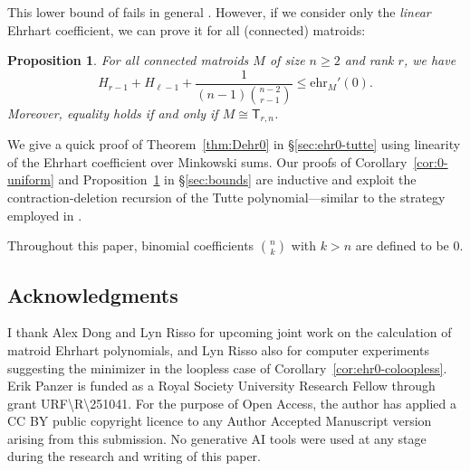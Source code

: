 \documentclass[pagesize,paper=A4,11pt,bibliography=totoc,oneside]{scrartcl}
\newtheorem{proposition}[thm]{Proposition}
\newcommand{\MM}[2]{\mathsf{T}_{#2,#1}} %
\newcommand{\ehr}{\mathrm{ehr}}
\newcommand{\HN}{H} %
\begin{document}
 This lower bound of \cite[Conjecture~1.5]{Ferroni:EhrhartMinimal} fails in general \cite{Ferroni:MatNotEhr}. However, if we consider only the \emph{linear} Ehrhart coefficient, we can prove it for all (connected) matroids:
\begin{proposition}\label{prop:MM}
    For all connected matroids $M$ of size $n\geq 2$ and rank $r$, we have
    \begin{equation*}
        \HN_{r-1} + \HN_{\ell-1} + \frac{1}{(n-1)\binom{n-2}{r-1}} \leq \ehr_M'(0).
    \end{equation*}
    Moreover, equality holds if and only if $M\cong \MM{n}{r}$.
\end{proposition}

We give a quick proof of Theorem~\ref{thm:Dehr0} in \S\ref{sec:ehr0-tutte} using linearity of the Ehrhart coefficient over Minkowski sums. Our proofs of Corollary~\ref{cor:0-uniform} and Proposition~\ref{prop:MM} in \S\ref{sec:bounds} are inductive and exploit the contraction-deletion recursion of the Tutte polynomial---similar to the strategy employed in \cite{Murty:NumberBases}.

Throughout this paper, binomial coefficients $\binom{n}{k}$ with $k>n$ are defined to be $0$.

\subsection*{Acknowledgments}
I thank Alex Dong and Lyn Risso for upcoming joint work on the calculation of matroid Ehrhart polynomials, and Lyn Risso also for computer experiments suggesting the minimizer in the loopless case of Corollary~\ref{cor:ehr0-coloopless}.
Erik Panzer is funded as a Royal Society University Research Fellow through grant {URF{\textbackslash}R{\textbackslash}251041}.
For the purpose of Open Access, the author has applied a CC BY public copyright licence to any Author Accepted Manuscript version arising from this submission.
No generative AI tools were used at any stage during the research and writing of this paper.

\newpage
\end{document}
